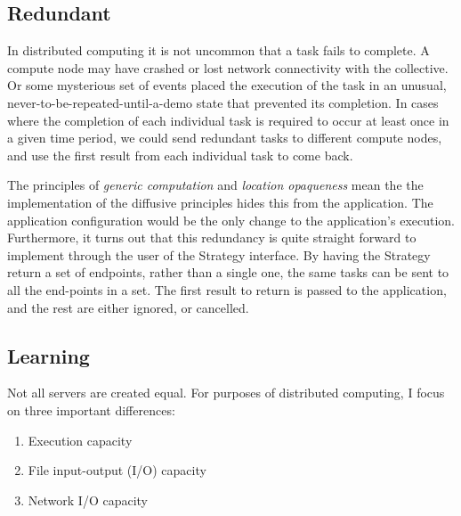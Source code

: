 \documentclass[11pt]{article}
\begin{document}


\subsection{Redundant}
In distributed computing it is not uncommon that a task fails to complete. A compute node may have crashed or lost network connectivity with the collective. Or some mysterious set of events placed the execution of the task in an unusual, never-to-be-repeated-until-a-demo state that prevented its completion. In cases where the completion of each individual task is required to occur at least once in a given time period, we could send redundant tasks to different compute nodes, and use the first result from each individual task to come back.

The principles of \emph{generic computation} and \emph{location opaqueness} mean the the implementation of the diffusive principles hides this from the application. The application configuration would be the only change to the application's execution. Furthermore, it turns out that this redundancy is quite straight forward to implement through the user of the \textsf{Strategy} interface. By having the \textsf{Strategy} return a set of endpoints, rather than a single one, the same tasks can be sent to all the end-points in a set. The first result to return is passed to the application, and the rest are either ignored, or cancelled.

\subsection{Learning}
Not all servers are created equal. For purposes of distributed computing, I focus on three important differences:
\begin{enumerate}
\item Execution capacity
\item File input-output (I/O) capacity
\item Network I/O capacity
\end{enumerate}
\end{document}
